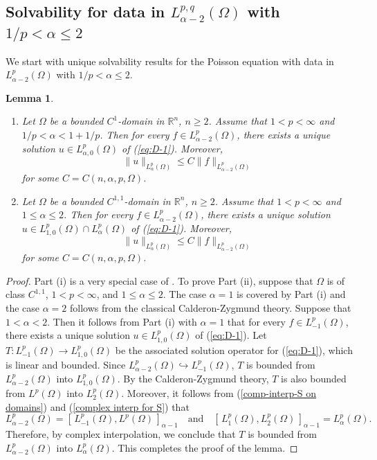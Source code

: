 \documentclass[reqno,centertags,11pt]{amsart}
\newtheorem{lem}[thm]{Lemma}
\theoremstyle{definition}
\numberwithin{thm}{section}
\numberwithin{equation}{section}
\newcommand{\R}{{\mathbb{R}}}
\begin{document}
\subsection{Solvability  for data in $L_{\alpha-2}^{p,q}(\Omega )$ with $1/p < \alpha \le 2$}

 We start with   unique solvability results for the Poisson equation  with  data in $L_{\alpha-2}^{p}(\Omega )$ with $1/p < \alpha \le 2$.

\begin{lem}\label{Poisson-S spaces}
\begin{enumerate}[{\upshape(i)}]
\item  Let $\Omega$ be a bounded $C^1$-domain in $\R^n   $, $n\ge 2$. Assume that $1<p<\infty$ and $1/p <\alpha<1+ 1/p$.
Then for every $f\in L_{\alpha-2}^{p}(\Omega )$, there exists a unique solution $u\in L_{\alpha, 0}^{p}(\Omega )$ of (\ref{eq:D-1}). Moreover,
\[
\|u\|_{L_{\alpha}^{p}(\Omega )} \le C \|f\|_{L_{\alpha-2}^{p}(\Omega )}
\]
for some $C=C(n,\alpha ,p, \Omega )$.
\item Let $\Omega$ be a bounded $C^{1,1}$-domain in $\R^n   $, $n\ge 2$.
Assume that $1<p<\infty$ and $  1   \le \alpha \le 2$. Then for every $f\in L_{\alpha-2}^{p}(\Omega )$, there exists a unique solution $u\in L_{1 , 0}^{p}(\Omega ) \cap L_{\alpha}^{p}(\Omega )$ of (\ref{eq:D-1}). Moreover,
\[
\|u\|_{L_{\alpha}^{p}(\Omega )} \le C \|f\|_{L_{\alpha-2}^{p}(\Omega )}
\]
for some $C=C(n, \alpha ,p, \Omega )$.
\end{enumerate}
\end{lem}

\begin{proof}
 Part (i) is a very special case of \cite[Theorems 1.1 and 1.3]{JK}.
To prove Part (ii), suppose that $\Omega$ is of class $C^{1,1}$, $1<p<\infty$,   and  $  1  \le  \alpha \le 2$. The case $\alpha =1$ is covered by Part (i) and the case $\alpha = 2$ follows    from  the classical Calderon-Zygmund theory.
Suppose that $1< \alpha < 2$.
Then it follows from Part (i)  with $\alpha=1$
that for every $f \in L_{-1}^{p} (\Omega )$, there exists a unique solution $u \in L_{1 ,0}^{p} (\Omega )$ of  (\ref{eq:D-1}). Let   $T : L_{-1}^{p} (\Omega ) \to L_{1 ,0}^{p} (\Omega )$ be the associated  solution operator for (\ref{eq:D-1}), which is linear and bounded.
Since $L^p_{\alpha-2}(\Omega)\hookrightarrow L_{  -1}^{p} (\Omega )$, $T$ is bounded from  $L^p_{\alpha-2}(\Omega)$ into $L_{1 ,0}^{p} (\Omega )$.
By the Calderon-Zygmund theory, $T$ is also bounded from $L^{p} (\Omega)$ into $L_2^{p} (\Omega )$. Moreover, it   follows from (\ref{comp-interp-S on domains}) and   (\ref{complex interp for S}) that
$$
L_{\alpha -2}^{p} (\Omega )= \left[ \, L_{  -1}^{p} (\Omega ) , L^{p} (\Omega)  \,\right]_{\alpha-1}  \quad\mbox{and}\quad \left[ \, L_{1}^{p} (\Omega ) , L_2^{p} (\Omega) \,\right]_{\alpha-1} = L_{\alpha}^{p} (\Omega ).
$$
Therefore, by complex interpolation, we conclude that    $T$ is bounded from $L_{\alpha -2}^{p} (\Omega )$ into $ L_\alpha^{p} (\Omega )$.
This completes the proof of the lemma.
\end{proof}
\end{document}
